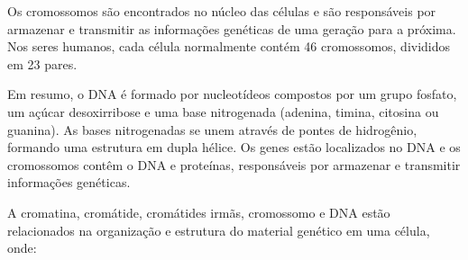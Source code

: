 \documentclass[11pt,a4paper]{article}
\begin{document}
    Os cromossomos são encontrados no núcleo das células e são responsáveis por armazenar e transmitir as informações genéticas de uma geração para a próxima. Nos seres humanos, cada célula normalmente contém 46 cromossomos, divididos em 23 pares.

	Em resumo, o DNA é formado por nucleotídeos compostos por um grupo fosfato, um açúcar desoxirribose e uma base nitrogenada (adenina, timina, citosina ou guanina). As bases nitrogenadas se unem através de pontes de hidrogênio, formando uma estrutura em dupla hélice. Os genes estão localizados no DNA e os cromossomos contêm o DNA e proteínas, responsáveis por armazenar e transmitir informações genéticas.

	A cromatina, cromátide, cromátides irmãs, cromossomo e DNA estão relacionados na organização e estrutura do material genético em uma célula, onde:
\end{document}
